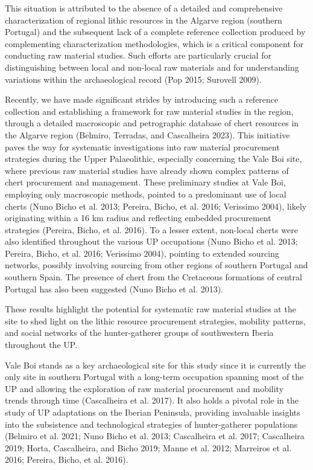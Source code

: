 \documentclass[
  a4paper,
  DIV=11,
  numbers=noendperiod]{scrreprt}
\begin{document}
This situation is attributed to the absence of a detailed and
comprehensive characterization of regional lithic resources in the
Algarve region (southern Portugal) and the subsequent lack of a complete
reference collection produced by complementing characterization
methodologies, which is a critical component for conducting raw material
studies. Such efforts are particularly crucial for distinguishing
between local and non-local raw materials and for understanding
variations within the archaeological record (Pop 2015; Surovell 2009).

Recently, we have made significant strides by introducing such a
reference collection and establishing a framework for raw material
studies in the region, through a detailed macroscopic and petrographic
database of chert resources in the Algarve region (Belmiro, Terradas,
and Cascalheira 2023). This initiative paves the way for systematic
investigations into raw material procurement strategies during the Upper
Palaeolithic, especially concerning the Vale Boi site, where previous
raw material studies have already shown complex patterns of chert
procurement and management. These preliminary studies at Vale Boi,
employing only macroscopic methods, pointed to a predominant use of
local cherts (Nuno Bicho et al. 2013; Pereira, Bicho, et al. 2016;
Verissimo 2004), likely originating within a 16 km radius and reflecting
embedded procurement strategies (Pereira, Bicho, et al. 2016). To a
lesser extent, non-local cherts were also identified throughout the
various UP occupations (Nuno Bicho et al. 2013; Pereira, Bicho, et al.
2016; Verissimo 2004), pointing to extended sourcing networks, possibly
involving sourcing from other regions of southern Portugal and southern
Spain. The presence of chert from the Cretaceous formations of central
Portugal has also been suggested (Nuno Bicho et al. 2013).

These results highlight the potential for systematic raw material
studies at the site to shed light on the lithic resource procurement
strategies, mobility patterns, and social networks of the
hunter-gatherer groups of southwestern Iberia throughout the UP.

Vale Boi stands as a key archaeological site for this study since it is
currently the only site in southern Portugal with a long-term occupation
spanning most of the UP and allowing the exploration of raw material
procurement and mobility trends through time (Cascalheira et al. 2017).
It also holds a pivotal role in the study of UP adaptations on the
Iberian Peninsula, providing invaluable insights into the subsistence
and technological strategies of hunter-gatherer populations (Belmiro et
al. 2021; Nuno Bicho et al. 2013; Cascalheira et al. 2017; Cascalheira
2019; Horta, Cascalheira, and Bicho 2019; Manne et al. 2012; Marreiros
et al. 2016; Pereira, Bicho, et al. 2016).
\end{document}
